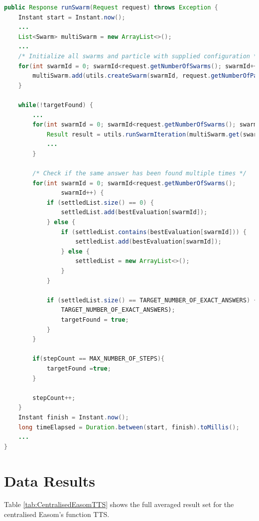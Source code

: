 \documentclass[oneside,12pt]{book}
\begin{document}
\begin{lstlisting}[basicstyle=\footnotesize, language=Java]
public Response runSwarm(Request request) throws Exception {
    Instant start = Instant.now();
    ...
    List<Swarm> multiSwarm = new ArrayList<>();
    ...
    /* Initialize all swarms and particle with supplied configuration */
    for(int swarmId = 0; swarmId<request.getNumberOfSwarms(); swarmId++) {
        multiSwarm.add(utils.createSwarm(swarmId, request.getNumberOfParticles(), request.getConfigVariables()));
    }

    while(!targetFound) {
        ...
        for(int swarmId = 0; swarmId<request.getNumberOfSwarms(); swarmId++) {
            Result result = utils.runSwarmIteration(multiSwarm.get(swarmId), stepCount);
            ...
        }
        
        /* Check if the same answer has been found multiple times */
        for(int swarmId = 0; swarmId<request.getNumberOfSwarms(); 
                swarmId++) {
            if (settledList.size() == 0) {
                settledList.add(bestEvaluation[swarmId]);
            } else {
                if (settledList.contains(bestEvaluation[swarmId])) {
                    settledList.add(bestEvaluation[swarmId]);
                } else {
                    settledList = new ArrayList<>();
                }
            }

            if (settledList.size() == TARGET_NUMBER_OF_EXACT_ANSWERS) {
                TARGET_NUMBER_OF_EXACT_ANSWERS);
                targetFound = true;
            }
        }

        if(stepCount == MAX_NUMBER_OF_STEPS){
            targetFound =true;
        }

        stepCount++;
    }
    Instant finish = Instant.now();
    long timeElapsed = Duration.between(start, finish).toMillis();
    ...
}
\end{lstlisting}
\label{listing:CentralisedServiceMethod}

\chapter{Data Results}

Table \ref{tab:CentralisedEasomTTS} shows the full averaged result set for the centralised Easom's function TTS. 
\end{document}
